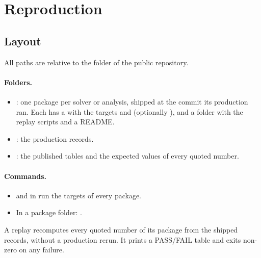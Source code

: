 \section{Reproduction}\label{ht:sec:repro}

\subsection{Layout}
All paths are relative to the folder  of the public repository.

\paragraph{Folders.}
\begin{itemize}
\item {}: one package per solver or analysis, shipped at the commit its production ran. Each has
 a  with the targets  and  (optionally ), and a 
 folder with the replay scripts and a README.
\item {}: the production records.
\item {}: the published tables and the expected values of every quoted number.
\end{itemize}

\paragraph{Commands.}
\begin{itemize}
\item {} and  in  run the targets of every package.
\item In a package folder: .
\end{itemize}
A replay recomputes every quoted number of its package from the shipped records, without a production rerun. It
prints a PASS/FAIL table and exits non-zero on any failure.


